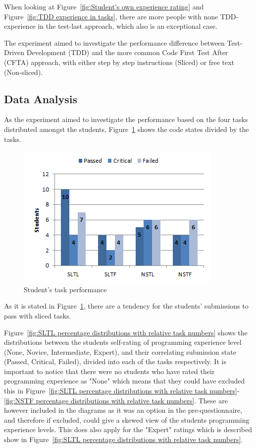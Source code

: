 \documentclass{sig-alternate-05-2015}
\begin{document}
When looking at Figure~\ref{fig:Student's own experience rating} and Figure~\ref{fig:TDD experience in tasks}, there are more people with none TDD-experience in the test-last approach, which also is an exceptional case.

The experiment aimed to investigate the performance difference between Test-Driven Development (TDD) and the more common Code First Test After (CFTA) approach, with either step by step instructions (Sliced) or free text (Non-sliced).\\

\subsection{Data Analysis} %
As the experiment aimed to investigate the performance based on the four tasks distributed amongst the students, Figure~\ref{fig:Student's task performance} shows the code states divided by the tasks.

\begin{figure}[!ht]
	\centering
	\includegraphics[width=1\linewidth]{img05}
	\caption{Student's task performance}
	\label{fig:Student's task performance}
\end{figure}

As it is stated in Figure~\ref{fig:Student's task performance}, there are a tendency for the students' submissions to pass with sliced tasks.

Figure~\ref{fig:SLTL percentage distributions with relative task numbers} shows the distributions between the students self-rating of programming experience level (None, Novice, Intermediate, Expert), and their correlating submission state (Passed, Critical, Failed), divided into each of the tasks respectively.
It is important to notice that there were no students who have rated their programming experience  as "None" which means that they could have excluded this in Figure~\ref{fig:SLTL percentage distributions with relative task numbers}-\ref{fig:NSTF percentage distributions with relative task numbers}. These are however included in the diagrams as it was an option in the pre-questionnaire, and therefore if excluded, could give a skewed view of the students programming experience levels. This does also apply for the "Expert" ratings which is described show in Figure~\ref{fig:SLTL percentage distributions with relative task numbers}.
\end{document}
